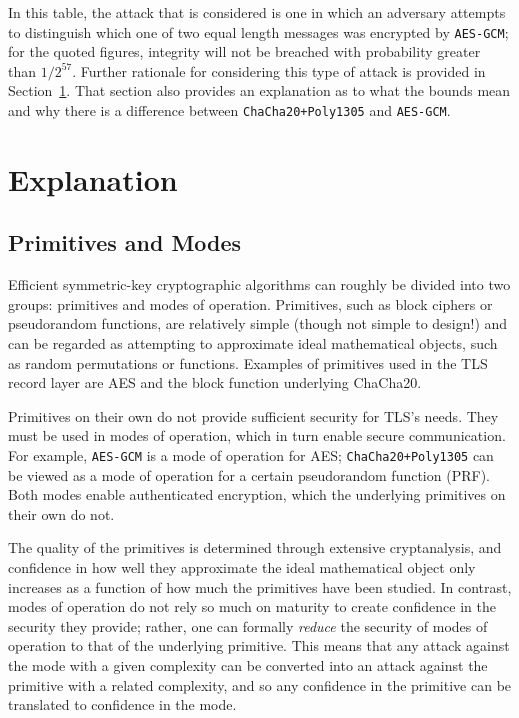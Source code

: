 \documentclass{article}
\begin{document}
In this table, the attack that is considered is one in which an adversary attempts to distinguish which one of two equal length messages was encrypted by \texttt{AES-GCM}; for the quoted figures, integrity will not be breached with probability greater than $1/2^{57}$. Further rationale for considering this type of attack is provided in Section~\ref{sec:explanation}. That section also provides an explanation as to what the bounds mean and why there is a difference between \texttt{ChaCha20+Poly1305} and \texttt{AES-GCM}.

\section{Explanation}\label{sec:explanation}

\subsection{Primitives and Modes}
Efficient symmetric-key cryptographic algorithms can roughly be divided into two groups: primitives and modes of operation. Primitives, such as block ciphers or pseudorandom functions, are relatively simple (though not simple to design!) and can be regarded as attempting to approximate ideal mathematical objects, such as random permutations or functions. Examples of primitives used in the TLS record layer are AES and the block function underlying ChaCha20. 

Primitives on their own do not provide sufficient security for TLS's needs. They must be used in modes of operation, which in turn enable secure communication. For example, \texttt{AES-GCM} is a mode of operation for AES; \texttt{ChaCha20+Poly1305} can be viewed as a mode of operation for a certain pseudorandom function (PRF). Both modes enable authenticated encryption, which the underlying primitives on their own do not.

The quality of the primitives is determined through extensive cryptanalysis, and confidence in how well they approximate the ideal mathematical object only increases as a function of how much the primitives have been studied. In contrast, modes of operation do not rely so much on maturity to create confidence in the security they provide; rather, one can formally \emph{reduce} the security of modes of operation to that of the underlying primitive. This means that any attack against the mode with a given complexity can be converted into an attack against the primitive with a related complexity, and so any confidence in the primitive can be translated to confidence in the mode.
\end{document}

